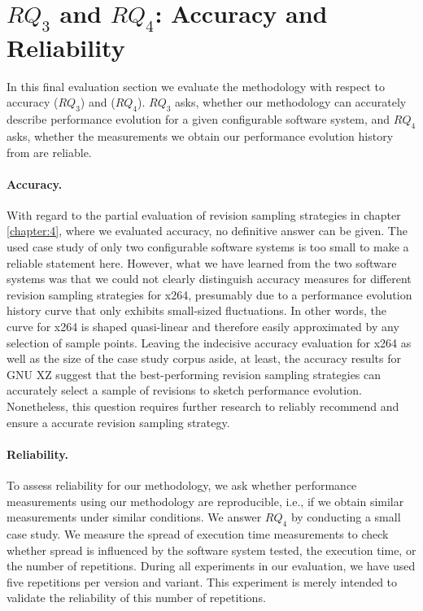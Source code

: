 \section{$RQ_3$ and $RQ_4$: Accuracy and Reliability}
\label{sec:reliability} In this final evaluation section we evaluate the
methodology with respect to accuracy ($RQ_3$) and ($RQ_4$). $RQ_3$ asks, whether
our methodology can accurately describe performance evolution for a given
configurable software system, and $RQ_4$ asks, whether the measurements we
obtain our performance evolution history from are reliable.

\paragraph{Accuracy.} With regard to the partial
evaluation of revision sampling strategies in chapter\,\ref{chapter:4}, where we
evaluated accuracy, no definitive answer can be given.
The used case study of only two configurable software systems is too small to make a reliable statement
here. However, what we have learned from the two software systems was that we
could not clearly distinguish accuracy measures for different revision sampling
strategies for x264, presumably due to a performance evolution history curve
that only exhibits small-sized fluctuations. In other words, the curve for x264
is shaped quasi-linear and therefore easily approximated by any selection of
sample points. Leaving the indecisive accuracy evaluation for x264 as well as
the size of the case study corpus aside, at least, the accuracy results for GNU
XZ suggest that the best-performing revision sampling strategies can accurately
select a sample of revisions to sketch performance evolution. Nonetheless, this
question requires further research to reliably recommend and ensure a accurate
revision sampling strategy.

\paragraph{Reliability.} To assess reliability for our methodology, we ask
whether performance measurements using our methodology are reproducible, i.e.,
if we obtain similar measurements under similar conditions. We answer
$RQ_4$ by conducting a small case study. We measure the spread of
execution time measurements to check whether spread is influenced by the
software system tested, the execution time, or the number of repetitions.
During all experiments in our evaluation, we have used five repetitions per
version and variant. This experiment is merely intended to validate the
reliability of this number of repetitions. 

